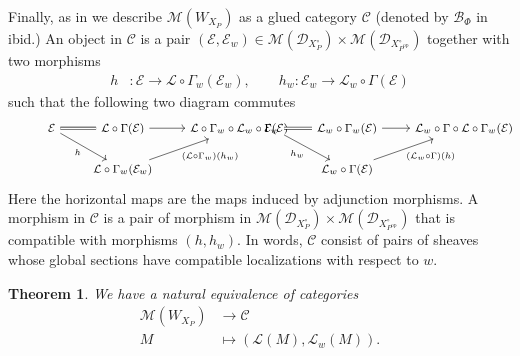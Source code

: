 \documentclass[11pt,a4paper,usenames,dvipsnames,reqno]{amsart}
\numberwithin{equation}{section}
\newtheorem{Thm}{Theorem}[section]
\theoremstyle{definition}
\theoremstyle{remark}
\begin{document}
Finally, as in \cite{BBP:Gluingbasicaffine} we describe $\mathcal{M}(W_{X_P})$ as a glued category $\mathcal{C}$ (denoted by $\mathcal{B}_\Phi$ in ibid.) An object in $\mathcal{C}$ is a pair $(\mathcal{E},\mathcal{E}_w)\in \mathcal{M}(\mathcal{D}_{X_P^\circ})\times \mathcal{M}(\mathcal{D}_{X_{P^{\mathrm{op}}}^\circ})$ together with two morphisms
\begin{align*}
    h&:\mathcal{E}\longrightarrow \mathcal{L}\circ \Gamma_w(\mathcal{E}_w),\quad\quad h_w:\mathcal{E}_w\to \mathcal{L}_w\circ\Gamma(\mathcal{E})
\end{align*}
such that the following two diagram commutes
\[
\begin{minipage}{0.45\textwidth}
\centering
\footnotesize
    \begin{tikzcd}
        \mathcal{E}\ar[r,equal]\ar[rd,"h",swap]& \mathcal{L}\circ \Gamma(\mathcal{E}) \ar[r]& \mathcal{L}\circ \Gamma_w\circ \mathcal{L}_w\circ \Gamma(\mathcal{E})\\
        & \mathcal{L}\circ \Gamma_w(\mathcal{E}_w)\ar[ru,swap,"(\mathcal{L}\circ \Gamma_w)(h_w)"]
    \end{tikzcd}
\end{minipage}
\hfill
\begin{minipage}{0.45\textwidth}
\centering
\footnotesize
    \begin{tikzcd}
        \mathcal{E}_w\ar[r,equal]\ar[rd,"h_w",swap]& \mathcal{L}_w\circ \Gamma_w(\mathcal{E}) \ar[r]& \mathcal{L}_w\circ \Gamma\circ \mathcal{L}\circ \Gamma_w(\mathcal{E})\\
        & \mathcal{L}_w\circ \Gamma(\mathcal{E})\ar[ru,swap,"(\mathcal{L}_w\circ \Gamma)(h)"]
    \end{tikzcd}
\end{minipage}
\]
Here the horizontal maps are the maps induced by adjunction morphisms. A morphism in $\mathcal{C}$ is a pair of morphism in $\mathcal{M}(\mathcal{D}_{X_P^\circ})\times \mathcal{M}(\mathcal{D}_{X_{P^{\mathrm{op}}}^\circ})$ that is compatible with morphisms $(h,h_w).$ In words, $\mathcal{C}$ consist of pairs of sheaves whose global sections have compatible localizations with respect to $w.$

\begin{Thm}\label{thm:equivalence}
    We have a natural equivalence of categories
    \begin{align*}
        \mathcal{M}(W_{X_P})&\longrightarrow\mathcal{C}\\
        M&\longmapsto (\mathcal{L}(M),\mathcal{L}_w(M)).
    \end{align*}
\end{Thm}
\end{document}
